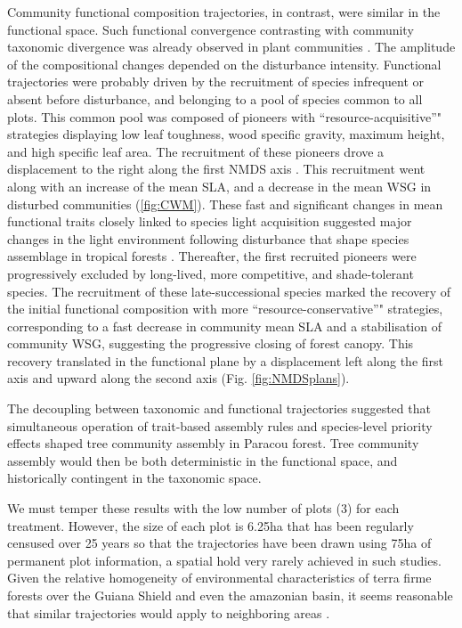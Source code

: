 \documentclass[fleqn,10pt]{ArtEcoFoG} %
\begin{document}
Community functional composition trajectories, in contrast, were similar
in the functional space. \color{red}Such functional convergence
contrasting with community taxonomic divergence was already observed in
plant communities \citep{Fukami2005}.\color{black} The amplitude of the
compositional changes depended on the disturbance intensity. Functional
trajectories were probably driven by the recruitment of species
infrequent or absent before disturbance, and belonging to a pool of
species common to all plots. This common pool was composed of pioneers
with ``resource-acquisitive''" strategies displaying low leaf toughness,
wood specific gravity, maximum height, and high specific leaf area. The
recruitment of these pioneers drove a displacement to the right along
the first NMDS axis \citep{Westoby1998, Wright2004, Reich2014}.
\color{red}This recruitment went along with an increase of the mean SLA,
and a decrease in the mean WSG in disturbed communities (\ref{fig:CWM}).
These fast and significant changes in mean functional traits closely
linked to species light acquisition \citep{Wright2004, Chave2009b}
suggested major changes in the light environment following disturbance
that shape species assemblage in tropical forests
\citep{Pena2008, Carreno-Rocabado2012}. Thereafter, the first recruited
pioneers were progressively excluded by long-lived, more competitive,
and shade-tolerant species. The recruitment of these late-successional
species marked the recovery of the initial functional composition with
more ``resource-conservative''" strategies, corresponding to a fast
decrease in community mean SLA and a stabilisation of community WSG,
suggesting the progressive closing of forest canopy. \color{black} This
recovery translated in the functional plane by a displacement left along
the first axis and upward along the second axis (Fig.
\ref{fig:NMDSplans}).

The decoupling between taxonomic and functional trajectories suggested
that simultaneous operation of trait-based assembly rules and
species-level priority effects shaped tree community assembly in Paracou
forest. Tree community assembly would then be both deterministic in the
functional space, and historically contingent in the taxonomic space.

\color{red} We must temper these results with the low number of plots
(3) for each treatment. However, the size of each plot is 6.25ha that
has been regularly censused over 25 years so that the trajectories have
been drawn using 75ha of permanent plot information, a spatial hold very
rarely achieved in such studies. Given the relative homogeneity of
environmental characteristics of terra firme forests over the Guiana
Shield and even the amazonian basin, it seems reasonable that similar
trajectories would apply to neighboring areas
\citep{Guitet2015, Guitet2018}. \color{black}
\end{document}
